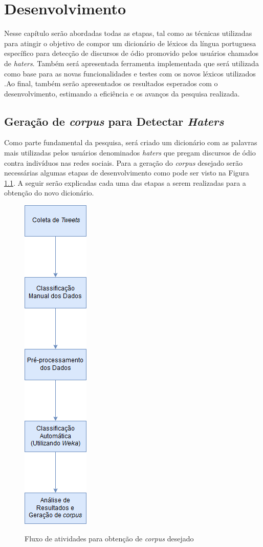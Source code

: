 \chapter{Desenvolvimento}
\label{cap:Desenvolvimento}
Nesse capítulo serão abordadas todas as etapas, tal como as técnicas utilizadas para atingir o objetivo de compor um dicionário de léxicos da língua portuguesa específico para detecção de discursos de ódio promovido pelos usuários chamados de \textit{haters}. Também será apresentada ferramenta implementada que será utilizada como base para as novas funcionalidades e testes com os novos léxicos utilizados .Ao final, também serão apresentados os resultados esperados com o desenvolvimento, estimando a eficiência e os avanços da pesquisa realizada. 

\section{Geração de \textit{corpus} para Detectar \textit{Haters}}
\label{sec:geracaohater}
Como parte fundamental da pesquisa, será criado um dicionário com as palavras mais utilizadas pelos usuários denominados \textit{haters} que pregam discursos de ódio contra indivíduos nas redes sociais. Para a geração do \textit{corpus} desejado serão necessárias algumas etapas de desenvolvimento como pode ser visto na Figura \ref{fig:fluxodesenvolvimento}. A seguir serão explicadas cada uma das etapas a serem realizadas para a obtenção do novo dicionário.

\begin{figure}[!h]
\centering 
\caption{Fluxo de atividades para obtenção de \textit{corpus} desejado}
\includegraphics[scale=0.45]{imagens/fluxodesenvolvimento.png}
\label{fig:fluxodesenvolvimento}
\end{figure}

